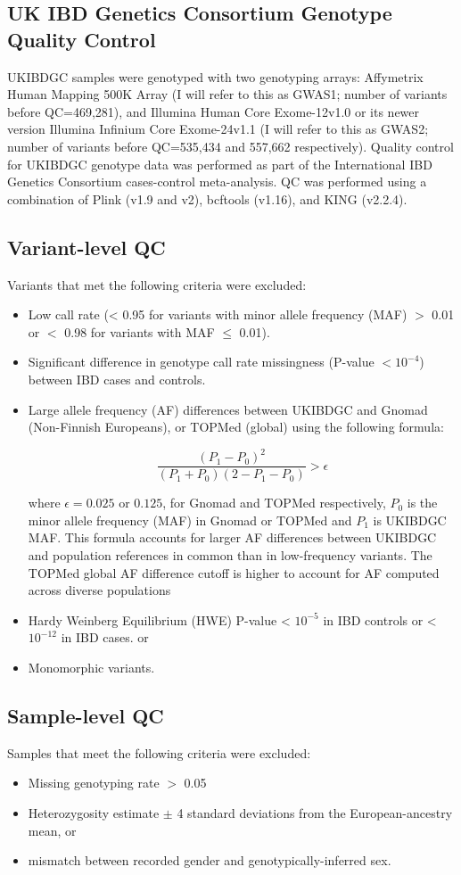 \subsection{UK IBD Genetics Consortium Genotype Quality Control}
UKIBDGC samples were genotyped with two genotyping arrays: Affymetrix Human Mapping 500K Array (I will refer to this as GWAS1; number of variants before QC=469,281), and Illumina Human Core Exome-12v1.0 or its newer version Illumina Infinium Core Exome-24v1.1 (I will refer to this as GWAS2; number of variants before QC=535,434 and 557,662 respectively). Quality control for UKIBDGC genotype data was performed as part of the International IBD Genetics Consortium cases-control meta-analysis. QC was performed using a combination of Plink (v1.9 and v2), bcftools (v1.16), and KING (v2.2.4).
\subsection{Variant-level QC}
Variants that met the following criteria were excluded: 
\begin{itemize}
  \item Low call rate (< 0.95 for variants with minor allele frequency (MAF) $>$ 0.01 or $<$ 0.98 for variants with MAF $\leq$ 0.01).
  \item Significant difference in genotype call rate missingness (P-value $< 10^{-4}$) between IBD cases and controls.
  \item Large allele frequency (AF) differences between UKIBDGC and Gnomad (Non-Finnish Europeans), or TOPMed (global) using the following formula:

$$\frac{(P_{1}-P_{0})^{2}}{(P_{1}+P_{0})(2-P_{1}-P_{0})} > \epsilon$$ 


where $\epsilon=0.025$ or $0.125$, for Gnomad and TOPMed respectively,  $P_{0}$ is the minor allele frequency (MAF) in Gnomad or TOPMed and $P_{1}$ is UKIBDGC MAF. This formula accounts for larger AF differences between UKIBDGC and population references in common than in low-frequency variants. The TOPMed global AF difference cutoff is higher to account for AF computed across diverse populations
\item Hardy Weinberg Equilibrium (HWE) P-value < $10^{-5}$ in IBD controls or < $10^{-12}$ in IBD cases.
 or 
\item Monomorphic variants. 
\end{itemize}

\subsection{Sample-level QC}
Samples that meet the following criteria were excluded:
\begin{itemize}
\item Missing genotyping rate $>$ 0.05
\item Heterozygosity estimate $\pm$ 4 standard deviations from the European-ancestry mean, or 
\item mismatch between recorded gender and genotypically-inferred sex. 
\end{itemize}
